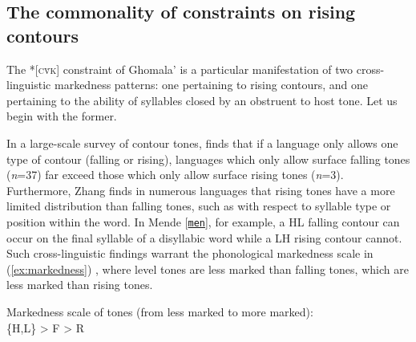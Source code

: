 \documentclass[output=paper,colorlinks,citecolor=brown,draft,draftmode]{langscibook}
\begin{document}
\subsection{The commonality of constraints on rising contours}\label{sec:constraints}
The	*[\textsc{c\v{v}k}] constraint of Ghomala' is a particular manifestation of two cross-linguistic markedness patterns: one pertaining to rising contours, and one pertaining to the ability of syllables closed by an obstruent to host tone.
Let us begin with the former. 

In a large-scale survey of contour tones, \citet{zhang2013} finds that if a language only allows one type of contour (falling or rising), languages which only allow surface falling tones (\textit{n}=37) far exceed those which only allow surface rising tones (\textit{n}=3).
Furthermore, Zhang finds in numerous languages that rising tones have a more limited distribution than falling tones, such as with respect to syllable type or position within the word.
In Mende 
[\href{https://glottolog.org/resource/languoid/id/mend1266}{\texttt{men}}], for example, a HL falling contour can occur on the final syllable of a disyllabic word while a LH rising contour cannot.
Such cross-linguistic findings warrant the phonological markedness scale in (\ref{ex:markedness})  \citep{yip2002,hyman2007}, where level tones are less marked than falling tones, which are less marked than rising tones. 

\begin{exe}
	\ex  Markedness scale of tones (from less marked to more marked):\\  \label{ex:markedness}
	\{H,L\} > F > R
\end{exe}
\end{document}
